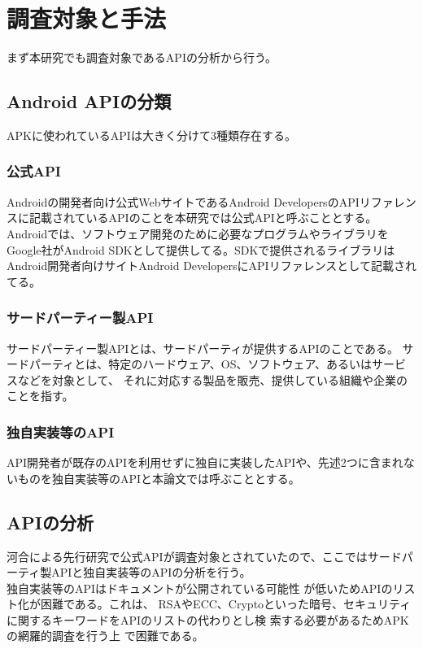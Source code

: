 \newpage
\section{調査対象と手法}
まず本研究でも調査対象であるAPIの分析から行う。
\label{sec:APIの分類}
\subsection{Android APIの分類}

APKに使われているAPIは大きく分けて3種類存在する。
\subsubsection {公式API}

Androidの開発者向け公式WebサイトであるAndroid DevelopersのAPIリファレンスに記載されているAPIのことを本研究では公式APIと呼ぶこととする。
Androidでは、ソフトウェア開発のために必要なプログラムやライブラリをGoogle社がAndroid SDKとして提供してる。SDKで提供されるライブラリはAndroid開発者向けサイトAndroid DevelopersにAPIリファレンスとして記載されてる。
\subsubsection {サードパーティー製API}

サードパーティー製APIとは、サードパーティが提供するAPIのことである。
サードパーティとは、特定のハードウェア、OS、ソフトウェア、あるいはサービスなどを対象として、
それに対応する製品を販売、提供している組織や企業のことを指す。

\subsubsection {独自実装等のAPI}
API開発者が既存のAPIを利用せずに独自に実装したAPIや、先述2つに含まれないものを独自実装等のAPIと本論文では呼ぶこととする。


\subsection{APIの分析}
河合による先行研究で公式APIが調査対象とされていたので、ここではサードパーティ製APIと独自実装等のAPIの分析を行う。
\label{sec:APIの分析}
\\独自実装等のAPIはドキュメントが公開されている可能性
が低いためAPIのリスト化が困難である。これは、
RSAやECC、Cryptoといった暗号、セキュリティ
に関するキーワードをAPIのリストの代わりとし検
索する必要があるためAPKの網羅的調査を行う上
で困難である。

